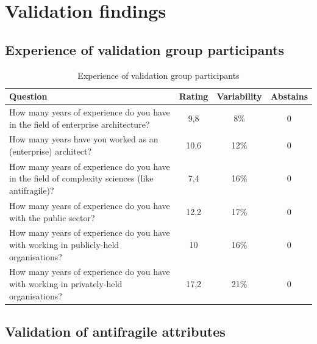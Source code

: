 \appendix
\chapter{Validation findings}

\section{Experience of validation group participants}

\begin{table}[!h]
	\centering
	\begin{tabular}{p{}ccc}
		\toprule
		\textbf{Question} & \textbf{Rating} & \textbf{Variability} & \textbf{Abstains} \\
		\midrule
		How many years of experience do you have in the field of enterprise architecture? & 9,8 & 8\% & 0 \\%
		How many years have you worked as an (enterprise) architect? & 10,6 & 12\% & 0 \\%
		How many years of experience do you have in the field of complexity sciences (like antifragile)? & 7,4 & 16\% & 0 \\%
		How many years of experience do you have with the public sector? & 12,2 & 17\% & 0 \\%
		How many years of experience do you have with working in publicly-held organisations? & 10 & 16\% & 0 \\%
		How many years of experience do you have with working in privately-held organisations? & 17,2 & 21\% & 0 \\%
		\bottomrule
	\end{tabular}%
	\caption{Experience of validation group participants}
	\label{tab:appexperiencevalidationgroup}%
\end{table}%
\newpage
\section{Validation of antifragile attributes}

